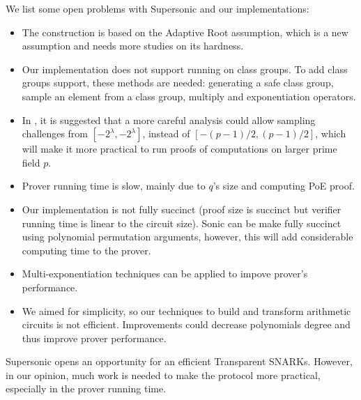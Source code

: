 We list some open problems with Supersonic and our implementations:
\begin{itemize}
    \item The construction is based on the Adaptive Root assumption, which is a new assumption and needs more studies on its hardness.
    \item Our implementation does not support running on class groups. To add class groups support, these methods are needed: generating a safe class group, sample an element from a class group, multiply and exponentiation operators.
    \item In \cite{bunz2020transparent}, it is suggested that a more careful analysis could allow sampling challenges from $[-2^\lambda, -2^\lambda]$, instead of $[-(p-1)/2, (p-1)/2]$, which will make it more practical to run proofs of computations on larger prime field $p$.
    \item Prover running time is slow, mainly due to $q$'s size and computing PoE proof.
    \item Our implementation is not fully succinct (proof size is succinct but verifier running time is linear to the circuit size). Sonic can be make fully succinct using polynomial permutation arguments, however, this will add considerable computing time to the prover.
    \item Multi-exponentiation techniques \cite{borges2017parallel} can be applied to impove prover's performance.
    \item We aimed for simplicity, so our techniques to build and transform arithmetic circuits is not efficient. Improvements could decrease polynomials degree and thus improve prover performance.
\end{itemize}

Supersonic opens an opportunity for an efficient Transparent SNARKs. However, in our opinion, much work is needed to make the protocol more practical, especially in the prover running time.
